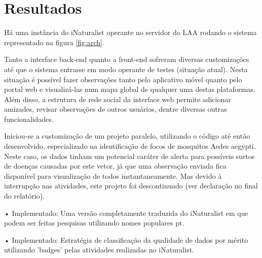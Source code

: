 \section*{Resultados}
Há uma instância do iNaturalist operante no servidor do LAA rodando o sistema representado na figura \ref{fig:arch}.
  
Tanto a interface back-end quanto a front-end sofreram diversas customizações até que o sistema entrasse em modo operante de testes (situação atual). Nesta situação é possível fazer observações tanto pelo aplicativo móvel quanto pelo portal web e visualizá-las num mapa global de qualquer uma destas plataformas. Além disso, a estrutura de rede social da interface web permite adicionar amizades, revisar observações de outros usuários, dentre diversas outras funcionalidades.
  
Iniciou-se a customização de um projeto paralelo, utilizando o código até então desenvolvido, especializado na identificação de focos de mosquitos Aedes aegypti. Neste caso, os dados tinham um potencial caráter de alerta para possíveis surtos de doenças causadas por este vetor, já que uma observação enviada fica disponível para visualização de todos instantaneamente. Mas devido à interrupção nas atividades, este projeto foi descontinuado (ver declaração no final do relatório).
    
• Implementado: Uma versão completamente traduzida do iNaturalist em que podem ser feitas pesquisas utilizando nomes populares pt.
    
• Implementado: Estratégia de classificação da qualidade de dados por mérito utilizando 'badges' pelas atividades realizadas no iNaturalist.